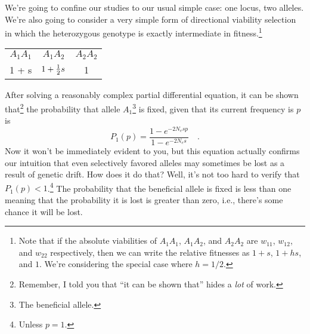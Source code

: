 \documentclass[12pt]{article}
\begin{document}
We're going to confine our studies to our usual simple case: one
locus, two alleles. We're also going to consider a very simple form of
directional viability selection in which the heterozygous genotype is
exactly intermediate in fitness.\footnote{Note that if the absolute
  viabilities of $A_1A_1$, $A_1A_2$, and $A_2A_2$ are $w_{11}$,
  $w_{12}$, and $w_{22}$ respectively, then we can write the relative
  fitnesses as $1+s$, $1+hs$, and $1$. We're considering the special
  case where $h=1/2$.}

\begin{center}
\begin{tabular}{ccc}
$A_1A_1$ & $A_1A_2$      & $A_2A_2$ \\
1 + s    & $1 + \frac{1}{2} s$ & 1
\end{tabular}
\end{center}

After solving a reasonably complex partial differential equation, it
can be shown that\footnote{Remember, I told you that ``it can be shown
that'' hides a {\it lot\/} of work.} the probability that allele
$A_1$\footnote{The beneficial allele.}  is fixed, given that its
current frequency is $p$ is
\begin{equation}
P_1(p) = \frac{1 - e^{-2N_esp}}{1 - e^{-2N_es}} \quad .
\label{eq:beneficial}
\end{equation}
Now it won't be immediately evident to you, but this equation actually
confirms our intuition that even selectively favored alleles may
sometimes be lost as a result of genetic drift. How does it do that?
Well, it's not too hard to verify that $P_1(p) < 1$.\footnote{Unless
  $p=1$.} The probability that the beneficial allele is fixed is less
than one meaning that the probability it is lost is greater than zero,
i.e., there's some chance it will be lost.
\end{document}
